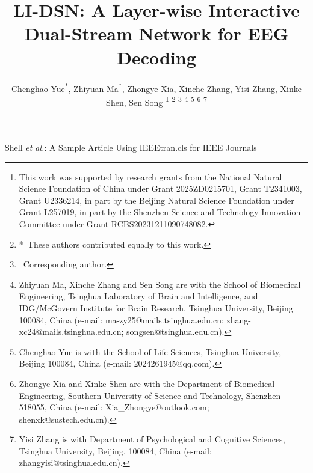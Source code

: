 \documentclass[journal]{IEEEtran}
\theoremstyle{plain}
\begin{document}
\title{LI-DSN: A Layer-wise Interactive Dual-Stream Network for EEG Decoding}

\author{Chenghao Yue\textsuperscript{*}, 
    Zhiyuan Ma\textsuperscript{*}, 
    Zhongye Xia,
    Xinche Zhang,
    Yisi Zhang\textsuperscript{\dag},
    Xinke Shen\textsuperscript{\dag},
    Sen Song\textsuperscript{\dag}
    \thanks{This work was supported by research grants from the National Natural Science Foundation of China under Grant 2025ZD0215701, Grant T2341003, Grant U2336214, in part by the Beijing Natural Science Foundation under Grant L257019, in part by the Shenzhen Science and Technology Innovation Committee under Grant RCBS20231211090748082.}
    \thanks{*~These authors contributed equally to this work.}
    \thanks{\dag~Corresponding author.}
    \thanks{Zhiyuan Ma, Xinche Zhang and Sen Song are with the School of Biomedical Engineering, Tsinghua Laboratory of Brain and Intelligence, and IDG/McGovern Institute for Brain Research, Tsinghua University, Beijing 100084, China (e-mail: ma-zy25@mails.tsinghua.edu.cn; zhang-xc24@mails.tsinghua.edu.cn; songsen@tsinghua.edu.cn).}
    \thanks{Chenghao Yue is with the School of Life Sciences, Tsinghua University, Beijing 100084, China (e-mail: 2024261945@qq.com).}
    \thanks{Zhongye Xia and Xinke Shen are with the Department of Biomedical Engineering, Southern University of Science and Technology, Shenzhen 518055, China (e-mail: Xia\_Zhongye@outlook.com; shenxk@sustech.edu.cn).}
    \thanks{Yisi Zhang is with Department of Psychological and Cognitive Sciences, Tsinghua University, Beijing, 100084, China (e-mail: zhangyisi@tsinghua.edu.cn).}
}
    
%
{Shell \MakeLowercase{\textit{et al.}}: A Sample Article Using IEEEtran.cls for IEEE Journals}


\maketitle
\end{document}
